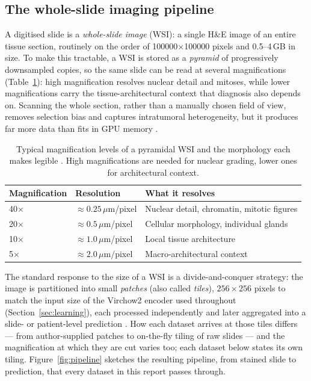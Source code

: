 \documentclass[11pt]{article}
\begin{document}
\subsection{The whole-slide imaging pipeline}
\label{sec:pipeline}
A digitised slide is a \emph{whole-slide image} (WSI): a single H\&E image of an entire tissue
section, routinely on the order of \num{100000}$\times$\num{100000} pixels and \num{0.5}--\num{4}\,GB
in size. To make this tractable, a WSI is
stored as a \emph{pyramid} of progressively downsampled copies, so the same slide can be read at
several magnifications (Table~\ref{tab:magnification}): high magnification resolves nuclear detail
and mitoses, while lower magnifications carry the tissue-architectural context that diagnosis also
depends on. Scanning the whole section, rather than a manually chosen field of view, removes
selection bias and captures intratumoral heterogeneity, but it produces far more data than fits in
GPU memory \citep{song2023aiPathology,abels2019computationalPathology}.

\begin{table}[ht]
  \centering
  \small
  \begin{tabularx}{\linewidth}{@{}llX@{}}
    \toprule
    Magnification & Resolution & What it resolves\\
    \midrule
    \num{40}$\times$ & ${\approx}\num{0.25}\,\mu$m/pixel & Nuclear detail, chromatin, mitotic figures\\
    \num{20}$\times$ & ${\approx}\num{0.5}\,\mu$m/pixel  & Cellular morphology, individual glands\\
    \num{10}$\times$ & ${\approx}\num{1.0}\,\mu$m/pixel  & Local tissue architecture\\
    \num{5}$\times$  & ${\approx}\num{2.0}\,\mu$m/pixel  & Macro-architectural context\\
    \bottomrule
  \end{tabularx}
  \caption{Typical magnification levels of a pyramidal WSI and the morphology each makes legible
  \citep{song2023aiPathology}. High magnifications are needed for nuclear grading, lower ones for
  architectural context.}
  \label{tab:magnification}
\end{table}

The standard response to the size of a WSI is a divide-and-conquer strategy: the image is
partitioned into small \emph{patches} (also called \emph{tiles}), $256\times256$ pixels to match the
input size of the Virchow2 encoder used throughout (Section~\ref{sec:learning}), each processed
independently and later aggregated into a slide- or patient-level prediction
\citep{song2023aiPathology}. How each dataset arrives at those tiles differs --- from author-supplied
patches to on-the-fly tiling of raw slides --- and the magnification at which they are cut varies too;
each dataset below states its own tiling. Figure~\ref{fig:pipeline} sketches the resulting pipeline, from stained
slide to prediction, that every dataset in this report passes through.
\end{document}
